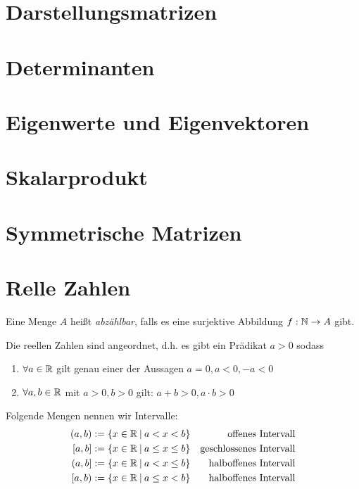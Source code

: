 \documentclass[]{article}
\begin{document}
\section{Darstellungsmatrizen}

\section{Determinanten}

\section{Eigenwerte und Eigenvektoren}

\section{Skalarprodukt}

\pagebreak

\section{Symmetrische Matrizen}

\pagebreak


\section{Relle Zahlen}

\begin{definition}
	Eine Menge $A$ heißt \emph{abzählbar}, falls es eine surjektive Abbildung $f : \mathbb{N} \rightarrow A$ gibt.
\end{definition}

\begin{definition}
	Die reellen Zahlen sind angeordnet, d.h. es gibt ein Prädikat $a > 0$ sodass
	\begin{enumerate}[noitemsep]
		\item $\forall a \in \mathbb{R}$ gilt genau einer der Aussagen $a = 0, a < 0, -a < 0$
		\item $\forall a,b \in \mathbb{R}$ mit $a > 0, b > 0$ gilt: $a + b > 0, a \cdot b > 0$
	\end{enumerate}
\end{definition}

\begin{definition}
	Folgende Mengen nennen wir Intervalle:
	\begin{align}
		(a,b) &:= \{ x \in \mathbb{R} \medspace | \medspace  a    < x    < b \} & \textnormal{offenes Intervall}       \\
		[a,b] &:= \{ x \in \mathbb{R} \medspace | \medspace  a \leq x \leq b \} & \textnormal{geschlossenes Intervall} \\
		(a,b] &:= \{ x \in \mathbb{R} \medspace | \medspace  a    < x \leq b \} & \textnormal{halboffenes Intervall}   \\
		[a,b) &:= \{ x \in \mathbb{R} \medspace | \medspace  a \leq x    < b \} & \textnormal{halboffenes Intervall}	
	\end{align}
\end{definition}
\end{document}
